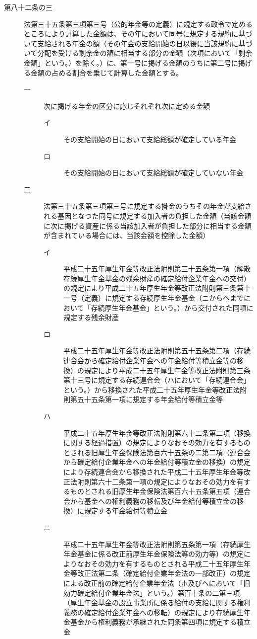 \documentclass[twocolumn,a4j,10pt]{ltjtarticle}
\begin{document}
\begin{description}
\item[第八十二条の三]法第三十五条第三項第三号（公的年金等の定義）に規定する政令で定めるところにより計算した金額は、その年において同号に規定する規約に基づいて支給される年金の額（その年金の支給開始の日以後に当該規約に基づいて分配を受ける剰余金の額に相当する部分の金額（次項において「剰余金額」という。）を除く。）に、第一号に掲げる金額のうちに第二号に掲げる金額の占める割合を乗じて計算した金額とする。
\begin{description}
\item[一]次に掲げる年金の区分に応じそれぞれ次に定める金額
\begin{description}
\item[イ]その支給開始の日において支給総額が確定している年金
\item[ロ]その支給開始の日において支給総額が確定していない年金
\end{description}
\item[二]法第三十五条第三項第三号に規定する掛金のうちその年金が支給される基因となつた同号に規定する加入者の負担した金額（当該金額に次に掲げる資産に係る当該加入者が負担した部分に相当する金額が含まれている場合には、当該金額を控除した金額）
\begin{description}
\item[イ]平成二十五年厚生年金等改正法附則第三十五条第一項（解散存続厚生年金基金の残余財産の確定給付企業年金への交付）の規定により平成二十五年厚生年金等改正法附則第三条第十一号（定義）に規定する存続厚生年金基金（ニからヘまでにおいて「存続厚生年金基金」という。）から交付された同項に規定する残余財産
\item[ロ]平成二十五年厚生年金等改正法附則第五十五条第二項（存続連合会から確定給付企業年金への年金給付等積立金等の移換）の規定により平成二十五年厚生年金等改正法附則第三条第十三号に規定する存続連合会（ハにおいて「存続連合会」という。）から移換された平成二十五年厚生年金等改正法附則第五十五条第一項に規定する年金給付等積立金等
\item[ハ]平成二十五年厚生年金等改正法附則第六十二条第二項（移換に関する経過措置）の規定によりなおその効力を有するものとされる旧厚生年金保険法第百六十五条の二第二項（連合会から確定給付企業年金への年金給付等積立金の移換）の規定により存続連合会から移換された平成二十五年厚生年金等改正法附則第六十二条第一項の規定によりなおその効力を有するものとされる旧厚生年金保険法第百六十五条第五項（連合会から基金への権利義務の移転及び年金給付等積立金の移換）に規定する年金給付等積立金
\item[ニ]平成二十五年厚生年金等改正法附則第五条第一項（存続厚生年金基金に係る改正前厚生年金保険法等の効力等）の規定によりなおその効力を有するものとされる平成二十五年厚生年金等改正法第二条（確定給付企業年金法の一部改正）の規定による改正前の確定給付企業年金法（ホ及びヘにおいて「旧効力確定給付企業年金法」という。）第百十条の二第三項（厚生年金基金の設立事業所に係る給付の支給に関する権利義務の確定給付企業年金への移転）の規定により存続厚生年金基金から権利義務が承継された同条第四項に規定する積立金

\end{description}
\end{description}
\end{description}
\end{document}
